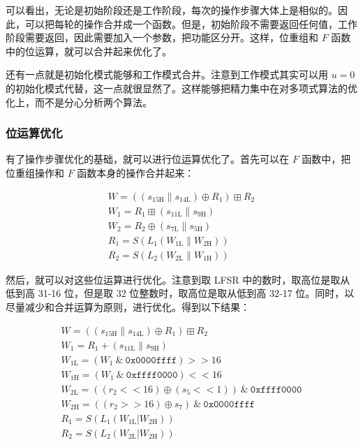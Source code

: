 \documentclass[a4paper, 10pt]{article}
\begin{document}
可以看出，无论是初始阶段还是工作阶段，每次的操作步骤大体上是相似的。因此，可以把每轮的操作合并成一个函数。但是，初始阶段不需要返回任何值，工作阶段需要返回，因此需要加入一个参数，把功能区分开。这样，位重组和 $ F $ 函数中的位运算，就可以合并起来优化了。

还有一点就是初始化模式能够和工作模式合并。注意到工作模式其实可以用 $ u = 0 $ 的初始化模式代替，这一点就很显然了。这样能够把精力集中在对多项式算法的优化上，而不是分心分析两个算法。

\subsubsection*{位运算优化}

有了操作步骤优化的基础，就可以进行位运算优化了。首先可以在 $ F $ 函数中，把位重组操作和 $ F $ 函数本身的操作合并起来：

\begin{gather*}
W = ((s_\mathrm{15H} \parallel s_\mathrm{14L}) \oplus R_1) \boxplus R_2 \\ 
W_1 = R_1 \boxplus (s_\mathrm{11L} \parallel s_\mathrm{9H}) \\ 
W_2 = R_2 \oplus (s_\mathrm{7L} \parallel s_\mathrm{5H}) \\ 
R_1 = S(L_1(W_\mathrm{1L} \parallel W_\mathrm{2H})) \\ 
R_2 = S(L_2(W_\mathrm{2L} \parallel W_\mathrm{1H}))
\end{gather*}

然后，就可以对这些位运算进行优化。注意到取 LFSR 中的数时，取高位是取从低到高 31-16 位，但是取 32 位整数时，取高位是取从低到高 32-17 位。同时，以尽量减少和合并运算为原则，进行优化。得到以下结果：

\begin{gather*}
W = ((s_\mathrm{15H} \parallel s_\mathrm{14L}) \oplus R_1) \boxplus R_2 \\ 
W_1 = R_1 + (s_\mathrm{11L} \parallel s_\mathrm{9H}) \\ 
W_\mathrm{1L} = (W_1 ~ \& ~ \mathtt{0x0000ffff}) >> 16 \\ 
W_\mathrm{1H} = (W_1 ~ \& ~ \mathtt{0xffff0000}) << 16 \\ 
W_\mathrm{2L} = ((r_2 << 16) \oplus (s_5 << 1)) ~ \& ~ \mathtt{0xffff0000} \\
W_\mathrm{2H} = ((r_2 >> 16) \oplus s_7) ~ \& ~ \mathtt{0x0000ffff} \\ 
R_1 = S(L_1(W_\mathrm{1L} | W_\mathrm{2H})) \\ 
R_2 = S(L_2(W_\mathrm{2L} | W_\mathrm{2H}))
\end{gather*}
\end{document}
